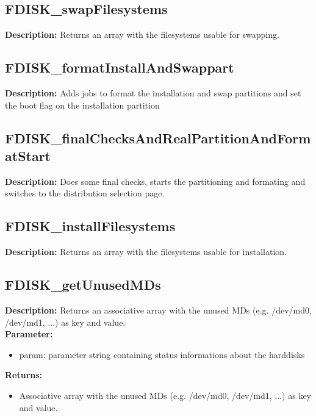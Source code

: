 \subsection{FDISK\_swapFilesystems}
\textbf{Description:} Returns an array with the filesystems usable for swapping.\\

\subsection{FDISK\_formatInstallAndSwappart}
\textbf{Description:} Adds jobs to format the installation and swap partitions and set the boot flag on the installation partition\\

\subsection{FDISK\_finalChecksAndRealPartitionAndFormatStart}
\textbf{Description:} Does some final checks, starts the partitioning and formating and switches to the distribution selection page.\\

\subsection{FDISK\_installFilesystems}
\textbf{Description:} Returns an array with the filesystems usable for installation.\\

\subsection{FDISK\_getUnusedMDs}
\textbf{Description:} Returns an associative array with the unused MDs (e.g. /dev/md0, /dev/md1, ...) as key and value.\\
\textbf{Parameter:}
\begin{itemize}
\item param: parameter string containing status informations about the harddisks
\end{itemize}
\textbf{Returns:}
\begin{itemize}
\item Associative array with the unused MDs (e.g. /dev/md0, /dev/md1, ...) as key and value.
\end{itemize}

